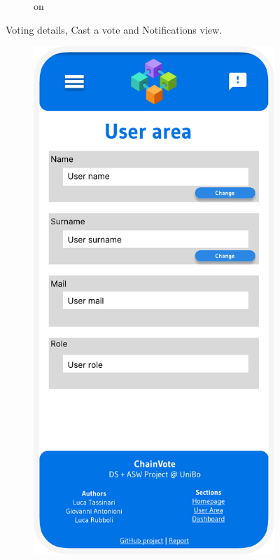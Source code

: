 \documentclass{scrartcl}
\begin{document}
\begin{figure}
\begin{subfigure}[b]{0.3\textwidth}
on{}
    \end{subfigure}
    \hfill
    \caption{Voting details, Cast a vote and Notifications view.}
    \label{fig:details-cast-notifications-view}
\end{figure}

\begin{figure}
    \begin{subfigure}[b]{0.3\textwidth}
        \centering
        \includegraphics[width=\textwidth]{./figures/mockups/user-area.pdf}

\end{subfigure}
\end{figure}
\end{document}

